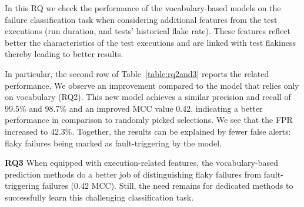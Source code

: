 In this RQ we check the performance of the vocabulary-based models on the failure classification task when considering additional features from the test executions (run duration, and tests' historical flake rate). These features reflect better the characteristics of the test executions and are linked with test flakiness thereby leading to better results. 

In particular, the second row of Table~\ref{table:rq2and3} reports the related performance. We observe an improvement compared to the model that relies only on vocabulary (RQ2). This new model achieves a similar precision and recall of 99.5\% and 98.7\% and an improved MCC value 0.42, indicating a better performance in comparison to randomly picked selections. We see that the FPR increased to 42.3\%. Together, the results can be explained by fewer false alerts: flaky failures being marked as fault-triggering by the model. 

\begin{tcolorbox}[
    left=2pt,right=2pt,top=2pt,bottom=2pt,
    arc=0pt,
    boxrule=1.2pt
]
\textbf{RQ3} When equipped with execution-related features, the vocabulary-based prediction methods do a better job of distinguishing flaky failures from fault-triggering failures (0.42 MCC). Still, the need remains for dedicated methods to successfully learn this challenging classification task.
\end{tcolorbox}